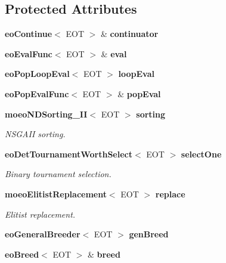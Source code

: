 \subsection*{Protected Attributes}
\begin{CompactItemize}
\item 
{\bf eo\-Continue}$<$ EOT $>$ \& {\bf continuator}\label{classmoeoNSGA__II_5723ef1daf0c523d4bf66a691fd6e909}

\item 
{\bf eo\-Eval\-Func}$<$ EOT $>$ \& {\bf eval}\label{classmoeoNSGA__II_31560a9c8d9499ce8dd361a004083ce9}

\item 
{\bf eo\-Pop\-Loop\-Eval}$<$ EOT $>$ {\bf loop\-Eval}\label{classmoeoNSGA__II_0308927592ac71d747ba345c74eb6595}

\item 
{\bf eo\-Pop\-Eval\-Func}$<$ EOT $>$ \& {\bf pop\-Eval}\label{classmoeoNSGA__II_abca45cb9b0099f294ff5172a287ce33}

\item 
{\bf moeo\-NDSorting\_\-II}$<$ EOT $>$ {\bf sorting}\label{classmoeoNSGA__II_0c64d278d6675671fb45a241d2b4802f}

\begin{CompactList}\small\item\em NSGAII sorting. \item\end{CompactList}\item 
{\bf eo\-Det\-Tournament\-Worth\-Select}$<$ EOT $>$ {\bf select\-One}\label{classmoeoNSGA__II_7f122201fa2d60855384389bf080e093}

\begin{CompactList}\small\item\em Binary tournament selection. \item\end{CompactList}\item 
{\bf moeo\-Elitist\-Replacement}$<$ EOT $>$ {\bf replace}\label{classmoeoNSGA__II_225df0fde7341dc20db61e822cee7aeb}

\begin{CompactList}\small\item\em Elitist replacement. \item\end{CompactList}\item 
{\bf eo\-General\-Breeder}$<$ EOT $>$ {\bf gen\-Breed}\label{classmoeoNSGA__II_33b60728fb89a6be957f3a312171941f}

\item 
{\bf eo\-Breed}$<$ EOT $>$ \& {\bf breed}\label{classmoeoNSGA__II_8908faf0b9a4334eaab0f34a2774fa16}

\end{CompactItemize}



